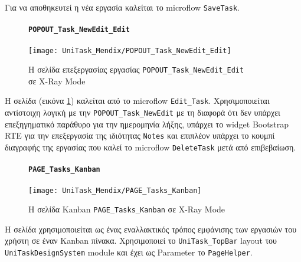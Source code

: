                 Για να αποθηκευτεί η νέα εργασία καλείται το microflow \texttt{SaveTask}.

                \begin{figure}[H] \noindent
                    \paragraph{\texttt{POPOUT\_Task\_NewEdit\_Edit}}
                    \begin{center}
                        \texttt{[image: UniTask\_Mendix/POPOUT\_Task\_NewEdit\_Edit]}
                        \caption{\centering Η σελίδα επεξεργασίας εργασίας \texttt{POPOUT\_Task\_NewEdit\_Edit} \\ σε X-Ray Mode}
                        \label{fig:unitask_POPOUT_Task_NewEdit_Edit}
                    \end{center}
                \end{figure}

                Η σελίδα (εικόνα \ref{fig:unitask_POPOUT_Task_NewEdit_Edit}) καλείται από το microflow \texttt{Edit\_Task}. Χρησιμοποιείται αντίστοιχη λογική με την \texttt{POPOUT\_Task\_NewEdit} με τη διαφορά ότι δεν υπάρχει επεξηγηματικό παράθυρο για την ημερομηνία λήξης, υπάρχει το widget Bootstrap RTE για την επεξεργασία της ιδιότητας \texttt{Notes} και επιπλέον υπάρχει το κουμπί διαγραφής της εργασίας που καλεί το microflow \texttt{DeleteTask} μετά από επιβεβαίωση.

                \begin{figure}[H] \noindent
                    \paragraph{\texttt{PAGE\_Tasks\_Kanban}}
                    \begin{center}
                        \texttt{[image: UniTask\_Mendix/PAGE\_Tasks\_Kanban]}
                        \caption{\centering Η σελίδα Kanban \texttt{PAGE\_Tasks\_Kanban} σε X-Ray Mode}
                        \label{fig:unitask_PAGE_Tasks_Kanban}
                    \end{center}
                \end{figure}

                Η σελίδα χρησιμοποιείται ως ένας εναλλακτικός τρόπος εμφάνισης των εργασιών του χρήστη σε έναν Kanban πίνακα. Χρησιμοποιεί το \texttt{UniTask\_TopBar} layout του \texttt{UniTaskDesignSystem} module και έχει ως Parameter το \texttt{PageHelper}.

